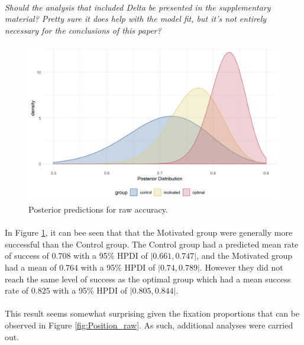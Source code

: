 \documentclass[12pt]{article}
\begin{document}
\paragraph{} \textit{Should the analysis that included Delta be presented in the supplementary material? Pretty sure it does help with the model fit, but it's not entirely necessary for the conclusions of this paper?}

\begin{figure}[ht!]
	\includegraphics[scale=0.8]{../Figures/Model_stan_rawacc.png}
	\centering
	\captionsetup{justification=centering}
	\caption{Posterior predictions for raw accuracy.}
	\label{fig:Model_raw_acc}
\end{figure}

\paragraph{} In Figure \ref{fig:Model_raw_acc}, it can bee seen that that the Motivated group were generally more successful than the Control group. The Control group had a predicted mean rate of success of $0.708$ with a 95\% HPDI of $|0.661, 0.747|$, and the Motivated group had a mean of $0.764$ with a 95\% HPDI of $|0.74, 0.789|$. However they did not reach the same level of success as the optimal group which had a mean success rate of $0.825$ with a 95\% HPDI of $|0.805, 0.844|$. 

\paragraph{} This result seems somewhat surprising given the fixation proportions that can be observed in Figure \ref{fig:Position_raw}. As such, additional analyses were carried out.
\end{document}
